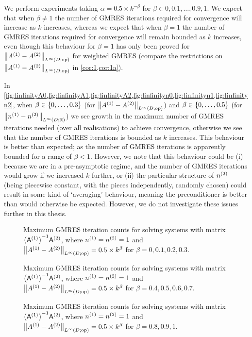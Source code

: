 We perform experiments taking $\alpha = 0.5 \times k^{-\beta}$ for $\beta \in 0,0.1,\ldots,0.9,1.$ We expect that when $\beta \neq 1$  the number of GMRES iterations required for convergence will increase as $k$ increases, whereas we expect that when $\beta = 1$ the number of GMRES iterations required for convergence will remain bounded as $k$ increases, even though this behaviour for $\beta=1$ has only been proved for $\NLiDRRdtd{\Aso-\Ast}$ for weighted GMRES (compare the restrictions on $\NLiDRRdtd{\Aso-\Ast}$ in \cref{cor:1,cor:1a}).


In \cref{fig:linfinityA0,fig:linfinityA1,fig:linfinityA2,fig:linfinityn0,fig:linfinityn1,fig:linfinityn2}, when $\beta \in \set{0,\ldots,0.3}$ (for $\NLiDRRdtd{\Aso-\Ast}$) and $\beta \in \set{0,\ldots,0.5}$ (for $\NLiDRR{\nso-\nst}$) we see growth in the maximum number of GMRES iterations needed (over all realisations) to achieve convergence, otherwise we see that the number of GMRES iterations is bounded as $k$ increases. This behaviour is better than expected; as the number of GMRES iterations is apparently bounded for a range of $\beta < 1.$ However, we note that this behaviour could be (i) because we are in a pre-asymptotic regime, and the number of GMRES iterations would grow if we increased $k$ further, or (ii) the particular structure of ${n}^{(2)}$ (being piecewise constant, with the pieces independently, randomly chosen) could result in some kind of `averaging' behaviour, meaning the preconditioner is better than would otherwise be expected. However, we do not investigate these issues further in this thesis.

    \begin{figure}
      \centering

  \caption{Maximum GMRES iteration counts for solving systems with matrix $\AmatoI\Amatt$, where ${n}^{(1)}={n}^{(2)}=1$ and $\NLiDRRdtd{\Aso-\Ast} = 0.5\times  k^{\beta}$ for $\beta = 0,0.1,0.2,0.3.$}\label{fig:linfinityA0}
    \end{figure}
    
    \begin{figure}
      \centering

   \caption{Maximum GMRES iteration counts for solving systems with matrix $\AmatoI\Amatt$, where ${n}^{(1)}={n}^{(2)}=1$ and $\NLiDRRdtd{\Aso-\Ast} = 0.5\times  k^{\beta}$ for $\beta = 0.4,0.5 ,0.6,0.7.$}\label{fig:linfinityA1}
\end{figure}

    \begin{figure}
      \centering

    \caption{Maximum GMRES iteration counts for solving systems with matrix $\AmatoI\Amatt$, where ${n}^{(1)}={n}^{(2)}=1$ and $\NLiDRRdtd{\Aso-\Ast} = 0.5\times  k^{\beta}$ for $\beta = 0.8,0.9,1.$}\label{fig:linfinityA2}
\end{figure}

